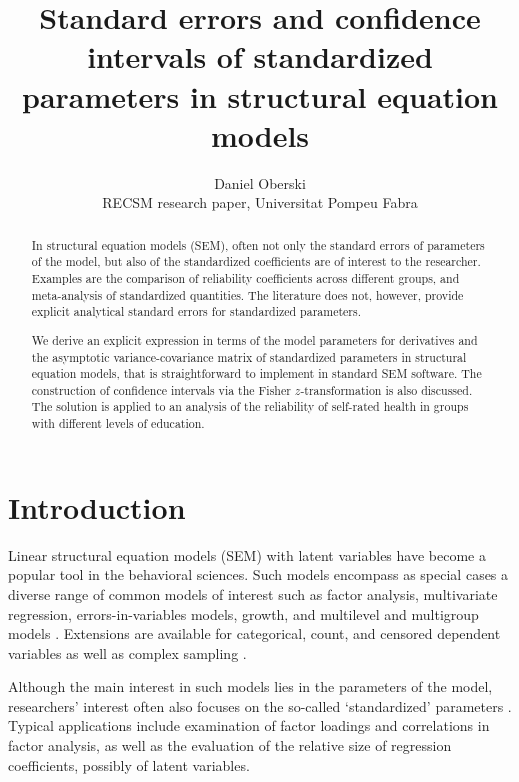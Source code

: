 \documentclass[a4paper, 11pt]{article}
\title{Standard errors and confidence intervals of standardized parameters in structural
equation models}
\author{Daniel Oberski\\RECSM research paper, Universitat Pompeu Fabra}
\newcommand{\0}{\boldsymbol{0}}
\begin{document}
\maketitle

\begin{abstract}\noindent
In structural equation models (SEM), often not only the standard errors of parameters of the model, but
also of the standardized coefficients are of interest to the researcher. 
Examples are the comparison of reliability coefficients across different groups, and meta-analysis of 
standardized quantities.
The literature does not, however, provide explicit analytical standard errors 
for standardized parameters. %

We derive an explicit expression in terms of the model parameters 
for derivatives and the asymptotic variance-covariance matrix of 
standardized parameters in structural equation models, that is straightforward to implement in standard SEM software. 
The construction of confidence intervals via the Fisher $z$-transformation is also discussed.
The solution is applied to an analysis of the reliability of self-rated health in groups with different levels of education.
\end{abstract}

\section{Introduction}\noindent
Linear structural equation models (SEM) with latent variables
have become a popular tool in the behavioral sciences. Such models encompass as special cases a diverse range of common models of interest such as factor
analysis, multivariate regression, errors-in-variables models, growth, and
multilevel and multigroup models \citep{bollen1989structural}. Extensions are available for categorical, count,
and censored dependent variables as well as complex sampling 
 \citep{muthen1995complex,muthen2002beyond}.

Although the main interest in such models lies in the parameters of 
the model, researchers' interest often also focuses on the so-called 
`standardized' parameters \citep{bollen1989structural}. Typical applications include examination of factor loadings and correlations in factor analysis, as well as the evaluation of the relative size of regression coefficients, possibly of latent variables.
\end{document}

